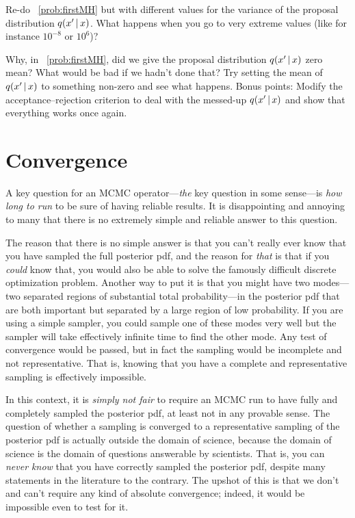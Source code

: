 \documentclass[12pt,twoside,pdftex]{article}
\begin{document}
\begin{problem}
Re-do \problemname~\ref{prob:firstMH} but with different values for
the variance of the proposal distribution $q(x'\,|\, x)$.
What happens when you go to very extreme values (like for instance
$10^{-8}$ or $10^6$)?
\end{problem}

\begin{problem}
Why, in \problemname~\ref{prob:firstMH}, did we give the proposal
distribution $q(x'\,|\, x)$ zero mean?
What would be bad if we hadn't done that?
Try setting the mean of $q(x'\,|\, x)$ to something non-zero and see
what happens.
Bonus points: Modify the acceptance--rejection criterion to deal with
the messed-up $q(x'\,|\, x)$ and show that everything works once
again.
\end{problem}

\section{Convergence}\label{sec:convergence}

A key question for an MCMC operator---\emph{the} key question in some
sense---is \emph{how long to run} to be sure of having reliable
results.
It is disappointing and annoying to many that there is no extremely
simple and reliable answer to this question.

The reason that there is no simple answer is that you can't really
ever know that you have sampled the full posterior pdf, and the reason
for \emph{that} is that if you \emph{could} know that, you would also
be able to solve the famously difficult discrete optimization
problem.
Another way to put it is that you might have two modes---two separated
regions of substantial total probability---in the posterior pdf that
are both important but separated by a large region of low probability.
If you are using a simple sampler, you could sample one of these modes
very well but the sampler will take effectively infinite time to find
the other mode.
Any test of convergence would be passed, but in fact the sampling
would be incomplete and not representative.
That is, knowing that you have a complete and representative sampling
is effectively impossible.

In this context,
  it is \emph{simply not fair} to require an MCMC run to have fully and completely
  sampled the posterior pdf,
  at least not in any provable sense.
The question of whether a sampling is converged to a representative sampling
  of the posterior pdf is actually outside the domain of science,
  because the domain of science is the domain of questions answerable by scientists.
That is, you can \emph{never know} that you have correctly sampled the posterior pdf,
  despite many statements in the literature to the contrary.%
The upshot of this is that we don't and can't require any kind of absolute convergence;
  indeed, it would be impossible even to test for it.
\end{document}
